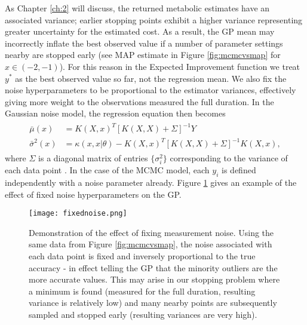 As Chapter \ref{ch:2} will discuss, the returned metabolic estimates have an associated variance; earlier stopping points exhibit a higher variance representing greater uncertainty for the estimated cost. As a result, the GP mean may incorrectly inflate the best observed value if a number of parameter settings nearby are stopped early (see MAP estimate in Figure \ref{fig:mcmcvsmap} for $x\in(-2, -1)$). For this reason in the Expected Improvement function we treat $y^*$ as the best observed value so far, not the regression mean. We also fix the noise hyperparameters to be proportional to the estimator variances, effectively giving more weight to the observations measured the full duration. In the Gaussian noise model, the regression equation then becomes
\begin{align}
\begin{split}
  \bar{\mu}(x) &= K(X, x)^T[K(X, X) + \Sigma]^{-1}Y \\
  \bar{\sigma}^2(x) &= \kappa(x, x\vert \theta) - K(X, x)^T[K(X,X) + \Sigma]^{-1}K(X,x),
\end{split}
\end{align}
where $\Sigma$ is a diagonal matrix of entries $\{\sigma_i^2\}$ corresponding to the variance of each data point \citep{Kersting:2007:MLH:1273496.1273546}. In the case of the MCMC model, each $y_i$ is defined independently with a noise parameter already. Figure \ref{fig:fixednoise} gives an example of the effect of fixed noise hyperparameters on the GP.

\begin{figure}[t]
\texttt{[image: fixednoise.png]}
\caption{Demonstration of the effect of fixing measurement noise. Using the same data from Figure \ref{fig:mcmcvsmap}, the noise associated with each data point is fixed and inversely proportional to the true accuracy - in effect telling the GP that the minority outliers are the more accurate values. This may arise in our stopping problem where a minimum is found (measured for the full duration, resulting variance is relatively low) and many nearby points are subsequently sampled and stopped early (resulting variances are very high).}
\label{fig:fixednoise}
\end{figure}